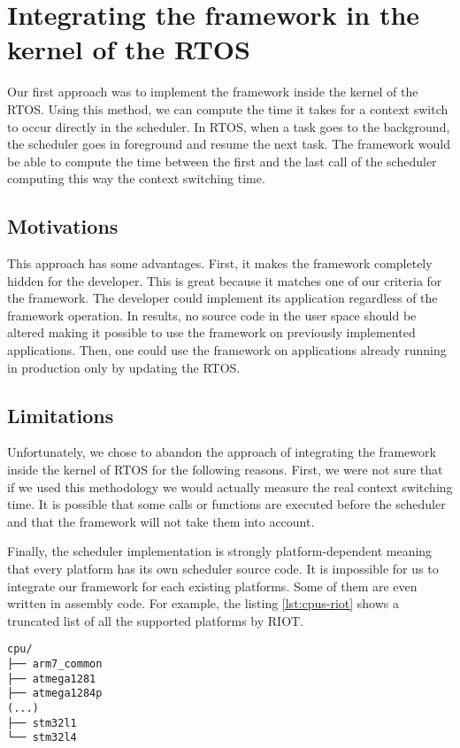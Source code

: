 \section{Integrating the framework in the kernel of the RTOS \label{sec:kernel}}

Our first approach was to implement the framework inside the kernel of the RTOS.
Using this method, we can compute the time it takes for a context switch to occur directly in the scheduler.
In RTOS, when a task goes to the background, the scheduler goes in foreground and resume the next task.
The framework would be able to compute the time between the first and the last call of the scheduler computing this way the context switching time.

\subsection{Motivations}

This approach has some advantages.
First, it makes the framework completely hidden for the developer.
This is great because it matches one of our criteria for the framework.
The developer could implement its application regardless of the framework operation.
In results, no source code in the user space should be altered making it possible to use the framework on previously implemented applications.
Then, one could use the framework on applications already running in production only by updating the RTOS.

\subsection{Limitations}

Unfortunately, we chose to abandon the approach of integrating the framework inside the kernel of RTOS for the following reasons.
First, we were not sure that if we used this methodology we would actually measure the real context switching time.
It is possible that some calls or functions are executed before the scheduler and that the framework will not take them into account.

Finally, the scheduler implementation is strongly platform-dependent meaning that every platform has its own scheduler source code.
It is impossible for us to integrate our framework for each existing platforms.
Some of them are even written in assembly code.
For example, the listing \ref{lst:cpus-riot} shows a truncated list of all the supported platforms by RIOT.

\begin{lstlisting}[style=ascii-tree, label={lst:cpus-riot}, caption={truncated list of platforms supported by RIOT}]
cpu/
├── arm7_common
├── atmega1281
├── atmega1284p
(...)
├── stm32l1
└── stm32l4
\end{lstlisting}
